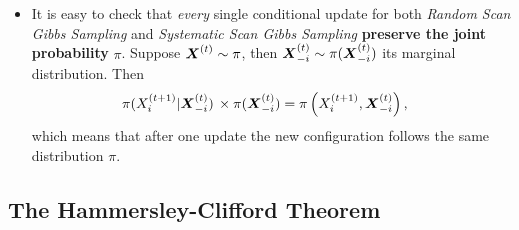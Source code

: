 \documentclass[11pt]{article}
\begin{document}
\begin{itemize}
\item It is easy to check that \emph{every} single conditional update for both \emph{Random Scan Gibbs Sampling} and \emph{Systematic Scan Gibbs Sampling} \textbf{preserve the joint probability} $\pi$. Suppose $\boldsymbol{X}^{(t)} \sim \pi$, then $\boldsymbol{X}_{-i}^{(t)} \sim \pi(\boldsymbol{X}_{-i}^{(t)})$ its marginal distribution. Then 
\begin{align*}
\pi(X_{i}^{(t+1)} | \boldsymbol{X}_{-i}^{(t)})\,\times \pi(\boldsymbol{X}_{-i}^{(t)}) &= \pi\left(X_{i}^{(t+1)}, \boldsymbol{X}_{-i}^{(t)}\right),
\end{align*} which means that after one update the new configuration follows the same distribution $\pi$.
\end{itemize}

\subsection{The Hammersley-Clifford Theorem}
\end{document}

